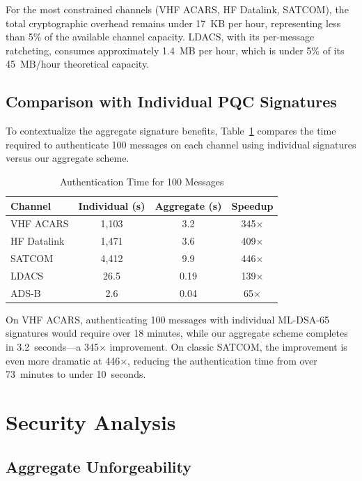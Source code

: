 \documentclass[conference,10pt]{IEEEtran}
\begin{document}
For the most constrained channels (VHF ACARS, HF Datalink, SATCOM), the total cryptographic overhead remains under 17~KB per hour, representing less than 5\% of the available channel capacity. LDACS, with its per-message ratcheting, consumes approximately 1.4~MB per hour, which is under 5\% of its 45~MB/hour theoretical capacity.

\subsection{Comparison with Individual PQC Signatures}

To contextualize the aggregate signature benefits, Table~\ref{tab:individual_comparison} compares the time required to authenticate 100 messages on each channel using individual signatures versus our aggregate scheme.

\begin{table}[t]
\centering
\caption{Authentication Time for 100 Messages}
\label{tab:individual_comparison}
\begin{tabular}{lccc}
\toprule
\textbf{Channel} & \textbf{Individual (s)} & \textbf{Aggregate (s)} & \textbf{Speedup} \\
\midrule
VHF ACARS & 1,103 & 3.2 & 345$\times$ \\
HF Datalink & 1,471 & 3.6 & 409$\times$ \\
SATCOM & 4,412 & 9.9 & 446$\times$ \\
LDACS & 26.5 & 0.19 & 139$\times$ \\
ADS-B & 2.6 & 0.04 & 65$\times$ \\
\bottomrule
\end{tabular}
\end{table}

On VHF ACARS, authenticating 100 messages with individual ML-DSA-65 signatures would require over 18 minutes, while our aggregate scheme completes in 3.2~seconds---a 345$\times$ improvement. On classic SATCOM, the improvement is even more dramatic at 446$\times$, reducing the authentication time from over 73~minutes to under 10~seconds.

\section{Security Analysis}
\label{sec:security}

\subsection{Aggregate Unforgeability}
\end{document}
